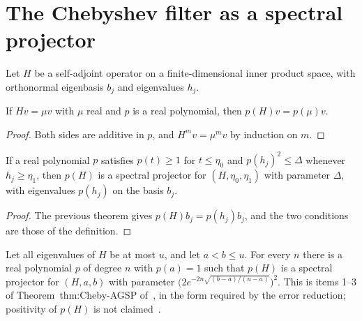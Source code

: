 \section{The Chebyshev filter as a spectral projector}

Let $H$ be a self-adjoint operator on a finite-dimensional inner product space,
with orthonormal eigenbasis $b_j$ and eigenvalues $h_j$.

\begin{theorem}
    \label{thm:polynomial_on_eigenvector}
    \leanok
    If $Hv=\mu v$ with $\mu$ real and $p$ is a real polynomial, then
    $p(H)v=p(\mu)v$.
\end{theorem}

\begin{proof}
    \leanok
    Both sides are additive in $p$, and $H^mv=\mu^mv$ by induction on $m$.
\end{proof}

\begin{theorem}
    \label{thm:polynomial_spectral_projector}
    \leanok
    If a real polynomial $p$ satisfies $p(t)\ge1$ for $t\le\eta_0$ and
    $p(h_j)^2\le\Delta$ whenever $h_j\ge\eta_1$, then $p(H)$ is a spectral
    projector for $(H,\eta_0,\eta_1)$ with parameter $\Delta$, with eigenvalues
    $p(h_j)$ on the basis $b_j$.
\end{theorem}

\begin{proof}
    \leanok
    The previous theorem gives $p(H)b_j=p(h_j)b_j$, and the two conditions
    are those of the definition.
\end{proof}

\begin{theorem}
    \label{thm:chebyshev_spectral_projector}
    \leanok
    Let all eigenvalues of $H$ be at most $u$, and let $a<b\le u$. For every
    $n$ there is a real polynomial $p$ of degree $n$ with $p(a)=1$ such that
    $p(H)$ is a spectral projector for $(H,a,b)$ with parameter
    $\bigl(2e^{-2n\sqrt{(b-a)/(u-a)}}\bigr)^2$. This is items 1--3 of
    Theorem~thm:Cheby-AGSP of~\cite[lines 789--853]{Arad2016RigorousRG}, in
    the form required by the error reduction; positivity of $p(H)$ is not
    claimed~\cite{gap:alvv16_chebyshev_filter_positivity}.
\end{theorem}

